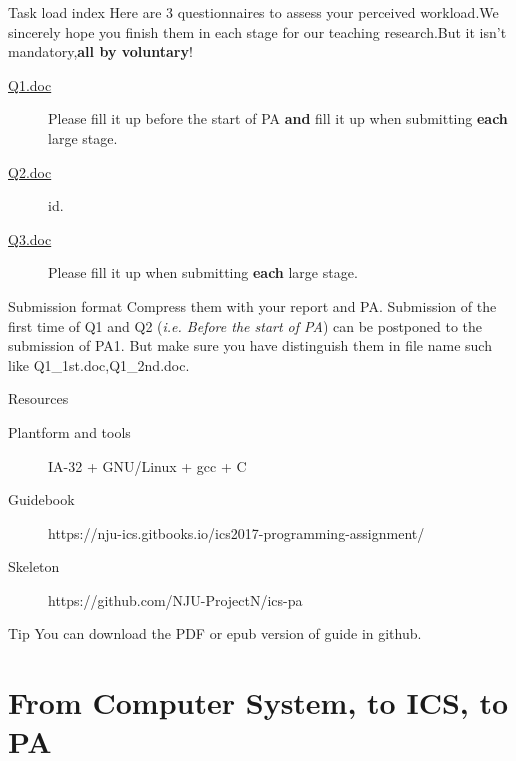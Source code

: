 \documentclass{beamer}
\begin{document}
\begin{frame}{Task load index}
	Here are 3 questionnaires to assess your perceived workload.\alert{We sincerely hope you finish them} in each stage for our teaching research.But it isn't mandatory,\textbf{all by voluntary}!
	\begin{description}
		\item 	[\href{https://github.com/xmh645214784/ics2017Slides/blob/master/introduction/Q1.doc}{Q1.doc}] Please fill it up before the start of PA \textbf{and} fill it up when submitting \textbf{each} large stage.
		\item	[\href{https://github.com/xmh645214784/ics2017Slides/blob/master/introduction/Q2.doc}{Q2.doc}] id.
		\item	[\href{https://github.com/xmh645214784/ics2017Slides/blob/master/introduction/Q3.doc}{Q3.doc}] Please fill it up when submitting \textbf{each} large stage.
	\end{description}
\begin{alertblock}{Submission format}
	Compress them with your report and PA. Submission of the first time of Q1 and Q2 (\textit{i.e. Before the start of PA}) can be postponed to the submission of PA1. But make sure you have distinguish them in file name such like Q1\_1st.doc,Q1\_2nd.doc.
\end{alertblock}
\end{frame}

\begin{frame}{Resources}
	\begin{description}
		\item [Plantform and tools] IA-32 + GNU/Linux + gcc + C
		\item [Guidebook] https://nju-ics.gitbooks.io/ics2017-programming-assignment/
		\item [Skeleton]https://github.com/NJU-ProjectN/ics-pa
	\end{description}
	\begin{alertblock}{Tip}
		You can download the PDF or epub version of guide in github.
	\end{alertblock}
\end{frame}


\section{From Computer System, to ICS, to PA}

\begin{frame}
\end{frame}
\end{document}
